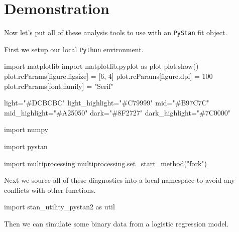 \documentclass[
  letterpaper,
  DIV=11,
  numbers=noendperiod]{scrartcl}
\newenvironment{Shaded}{\begin{snugshade}}{\end{snugshade}}
\newcommand{\DecValTok}[1]{\textcolor[rgb]{0.68,0.00,0.00}{#1}}
\newcommand{\ImportTok}[1]{\textcolor[rgb]{0.00,0.46,0.62}{#1}}
\newcommand{\NormalTok}[1]{\textcolor[rgb]{0.00,0.23,0.31}{#1}}
\newcommand{\OperatorTok}[1]{\textcolor[rgb]{0.37,0.37,0.37}{#1}}
\newcommand{\StringTok}[1]{\textcolor[rgb]{0.13,0.47,0.30}{#1}}
\begin{document}
\section{Demonstration}\label{demonstration}

Now let's put all of these analysis tools to use with an \texttt{PyStan}
fit object.

First we setup our local \texttt{Python} environment.

\begin{Shaded}
\begin{Highlighting}[]
\ImportTok{import}\NormalTok{ matplotlib}
\ImportTok{import}\NormalTok{ matplotlib.pyplot }\ImportTok{as}\NormalTok{ plot}
\NormalTok{plot.show()}
\NormalTok{plot.rcParams[}\StringTok{\textquotesingle{}figure.figsize\textquotesingle{}}\NormalTok{] }\OperatorTok{=}\NormalTok{ [}\DecValTok{6}\NormalTok{, }\DecValTok{4}\NormalTok{]}
\NormalTok{plot.rcParams[}\StringTok{\textquotesingle{}figure.dpi\textquotesingle{}}\NormalTok{] }\OperatorTok{=} \DecValTok{100}
\NormalTok{plot.rcParams[}\StringTok{\textquotesingle{}font.family\textquotesingle{}}\NormalTok{] }\OperatorTok{=} \StringTok{"Serif"}

\NormalTok{light}\OperatorTok{=}\StringTok{"\#DCBCBC"}
\NormalTok{light\_highlight}\OperatorTok{=}\StringTok{"\#C79999"}
\NormalTok{mid}\OperatorTok{=}\StringTok{"\#B97C7C"}
\NormalTok{mid\_highlight}\OperatorTok{=}\StringTok{"\#A25050"}
\NormalTok{dark}\OperatorTok{=}\StringTok{"\#8F2727"}
\NormalTok{dark\_highlight}\OperatorTok{=}\StringTok{"\#7C0000"}

\ImportTok{import}\NormalTok{ numpy}

\ImportTok{import}\NormalTok{ pystan}

\ImportTok{import}\NormalTok{ multiprocessing}
\NormalTok{multiprocessing.set\_start\_method(}\StringTok{"fork"}\NormalTok{)}
\end{Highlighting}
\end{Shaded}

Next we source all of these diagnostics into a local namespace to avoid
any conflicts with other functions.

\begin{Shaded}
\begin{Highlighting}[]
\ImportTok{import}\NormalTok{ stan\_utility\_pystan2 }\ImportTok{as}\NormalTok{ util}
\end{Highlighting}
\end{Shaded}

Then we can simulate some binary data from a logistic regression model.
\end{document}
